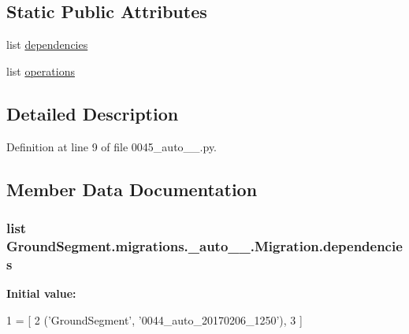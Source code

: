 \subsection*{Static Public Attributes}
\begin{DoxyCompactItemize}
\item 
list \hyperlink{class_ground_segment_1_1migrations_1_10045__auto__20170206__1323_1_1_migration_aabfcb5832fe101a80f900b0e0bf28f4e}{dependencies}
\item 
list \hyperlink{class_ground_segment_1_1migrations_1_10045__auto__20170206__1323_1_1_migration_a18d09ff0dfe44714c6d67c917136b054}{operations}
\end{DoxyCompactItemize}


\subsection{Detailed Description}


Definition at line 9 of file 0045\+\_\+auto\+\_\+\_.\+py.



\subsection{Member Data Documentation}
\hypertarget{class_ground_segment_1_1migrations_1_10045__auto__20170206__1323_1_1_migration_aabfcb5832fe101a80f900b0e0bf28f4e}{}
\subsubsection[{dependencies}]{\setlength{\rightskip}{0pt plus 5cm}list Ground\+Segment.\+migrations.\+\_\+auto\+\_\+\_.\+Migration.\+dependencies\hspace{0.3cm}{\ttfamily [static]}}\label{class_ground_segment_1_1migrations_1_10045__auto__20170206__1323_1_1_migration_aabfcb5832fe101a80f900b0e0bf28f4e}
{\bfseries Initial value\+:}
\begin{DoxyCode}
1 = [
2         (\textcolor{stringliteral}{'GroundSegment'}, \textcolor{stringliteral}{'0044\_auto\_20170206\_1250'}),
3     ]
\end{DoxyCode}


